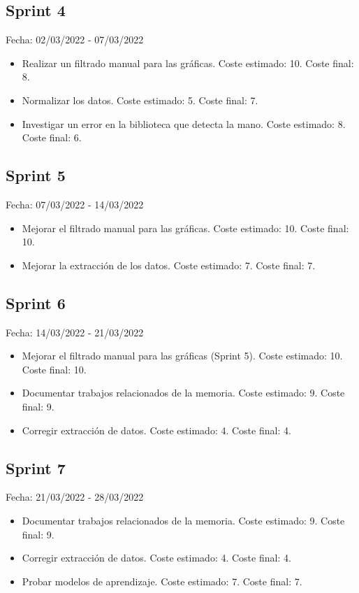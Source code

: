 \subsection{Sprint 4}
Fecha: 02/03/2022 - 07/03/2022
\begin{itemize}
	\item Realizar un filtrado manual para las gráficas. Coste estimado: 10. Coste final: 8. 
	\item Normalizar los datos. Coste estimado: 5. Coste final: 7.
	\item Investigar un error en la biblioteca que detecta la mano. Coste estimado: 8. Coste final: 6.
\end{itemize}

\subsection{Sprint 5}
Fecha: 07/03/2022 - 14/03/2022
\begin{itemize}
	\item Mejorar el filtrado manual para las gráficas. Coste estimado: 10. Coste final: 10.
	\item Mejorar la extracción de los datos. Coste estimado: 7. Coste final: 7.
\end{itemize}

\subsection{Sprint 6}
Fecha: 14/03/2022 - 21/03/2022
\begin{itemize}
	\item Mejorar el filtrado manual para las gráficas (Sprint 5). Coste estimado: 10. Coste final: 10.
	\item Documentar trabajos relacionados de la memoria. Coste estimado: 9. Coste final: 9.
	\item Corregir extracción de datos. Coste estimado: 4. Coste final: 4.
\end{itemize}

\subsection{Sprint 7}
Fecha: 21/03/2022 - 28/03/2022
\begin{itemize}
	\item Documentar trabajos relacionados de la memoria. Coste estimado: 9. Coste final: 9.
	\item Corregir extracción de datos. Coste estimado: 4. Coste final: 4.
	\item Probar modelos de aprendizaje. Coste estimado: 7. Coste final: 7.
\end{itemize}

